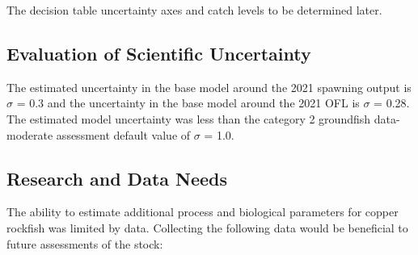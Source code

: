 \documentclass[11pt,
  english,
  a4paper,
]{article}
\begin{document}
\leavevmode\tagmcend\tagstructend\par


The decision table uncertainty axes and catch levels to be determined later.

\leavevmode\tagmcend\tagstructend\par


\hypertarget{evaluation-of-scientific-uncertainty}{%
\subsection{Evaluation of Scientific Uncertainty}\label{evaluation-of-scientific-uncertainty}}

\leavevmode\tagmcend\tagstructend


The estimated uncertainty in the base model around the 2021 spawning output is {\(\sigma\)\leavevmode\tagmcend\tagstructend} = 0.3 and the uncertainty in the base model around the 2021 OFL is {\(\sigma\)\leavevmode\tagmcend\tagstructend} = 0.28. The estimated model uncertainty was less than the category 2 groundfish data-moderate assessment default value of {\(\sigma\)\leavevmode\tagmcend\tagstructend} = 1.0.

\leavevmode\tagmcend\tagstructend\par


\hypertarget{research-and-data-needs}{%
\subsection{Research and Data Needs}\label{research-and-data-needs}}

\leavevmode\tagmcend\tagstructend


The ability to estimate additional process and biological parameters for copper rockfish was limited by data. Collecting the following data would be beneficial to future assessments of the stock:

\leavevmode\tagmcend\tagstructend\par
\end{document}
